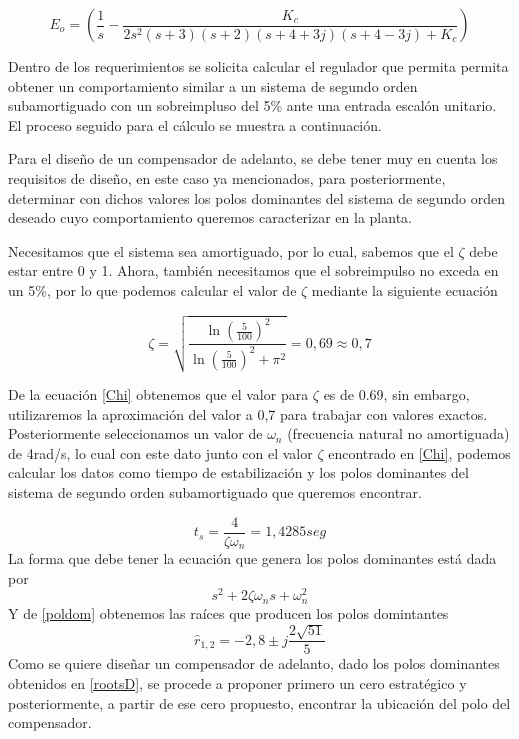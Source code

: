 \documentclass[12pt,letterpaper]{article}
\begin{document}
\begin{equation}
    {E_{o}=(\frac{1}{s} - \frac{K_{c}}{2s^{2}(s+3)(s+2)(s+4+3j)(s+4-3j)+K_{c}})}
    \label{Error1}
\end{equation}

Dentro de los requerimientos se solicita calcular el regulador que permita permita obtener un comportamiento similar a un sistema de segundo orden subamortiguado con un sobreimpluso del 5\% ante una entrada escalón unitario. El proceso seguido para el cálculo se muestra a continuación.

Para el diseño de un compensador de adelanto, se debe tener muy en cuenta los requisitos de diseño, en este caso ya mencionados, para posteriormente, determinar con dichos valores los polos dominantes del sistema de segundo orden deseado cuyo comportamiento queremos caracterizar en la planta.

Necesitamos que el sistema sea amortiguado, por lo cual, sabemos que el $\zeta$ debe estar entre 0 y 1. Ahora, también necesitamos que el sobreimpulso no exceda en un 5\%, por lo que podemos calcular el valor de $\zeta$ mediante la siguiente ecuación

\begin{equation}
    {\zeta = \sqrt{\frac{\ln{(\frac{5}{100})^{2}}}{\ln{(\frac{5}{100})^{2}+\pi^{2}}}}=0,69 \approx 0,7}
    \label{Chi}
\end{equation}

De la ecuación \ref{Chi} obtenemos que el valor para $\zeta$ es de 0.69, sin embargo, utilizaremos la aproximación del valor a 0,7 para trabajar con valores exactos. Posteriormente seleccionamos un valor de $\omega_{n}$ (frecuencia natural no amortiguada) de 4rad/s, lo cual con este dato junto con el valor $\zeta$ encontrado en \ref{Chi}, podemos calcular los datos como tiempo de estabilización y los polos dominantes del sistema de segundo orden subamortiguado que queremos encontrar.

\begin{equation}
    {t_{s}=\frac{4}{\zeta\omega_{n}}=1,4285seg}
    \label{ts}
\end{equation}
La forma que debe tener la ecuación que genera los polos dominantes está dada por
\begin{equation}
    {s^{2}+2\zeta\omega_{n}s+\omega_{n}^{2}}
    \label{poldom}
\end{equation}
Y de \ref{poldom} obtenemos las raíces que producen los polos domintantes
\begin{equation}
    {\widehat{r}_{1,2}} = {-2,8\pm j\frac{2\sqrt{51}}{5}}
    \label{rootsD}
\end{equation}
Como se quiere diseñar un compensador de adelanto, dado los polos dominantes obtenidos en \ref{rootsD}, se procede a proponer primero un cero estratégico y posteriormente, a partir de ese cero propuesto, encontrar la ubicación del polo del compensador.
\end{document}
